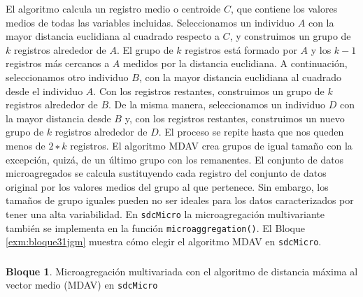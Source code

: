 \documentclass[]{book}
\newenvironment{Shaded}{\begin{snugshade}}{\end{snugshade}}
\newcommand{\CommentTok}[1]{\textcolor[rgb]{0.56,0.35,0.01}{\textit{#1}}}
\newcommand{\DataTypeTok}[1]{\textcolor[rgb]{0.13,0.29,0.53}{#1}}
\newcommand{\KeywordTok}[1]{\textcolor[rgb]{0.13,0.29,0.53}{\textbf{#1}}}
\newcommand{\NormalTok}[1]{#1}
\newcommand{\StringTok}[1]{\textcolor[rgb]{0.31,0.60,0.02}{#1}}
\theoremstyle{definition}
\theoremstyle{definition}
\newtheorem{example}{Bloque}[chapter]
\theoremstyle{definition}
\theoremstyle{definition}
\theoremstyle{remark}
\begin{document}
El algoritmo calcula un registro medio o centroide \(C\), que contiene los valores medios de todas las variables incluidas. Seleccionamos un individuo \(A\) con la mayor distancia euclidiana al cuadrado respecto a \(C\), y construimos un grupo de \(k\) registros alrededor de \(A\). El grupo de \(k\) registros está formado por \(A\) y los \(k-1\) registros más cercanos a \(A\) medidos por la distancia euclidiana. A continuación, seleccionamos otro individuo \(B\), con la mayor distancia euclidiana al cuadrado desde el individuo \(A\). Con los registros restantes, construimos un grupo de \(k\) registros alrededor de \(B\). De la misma manera, seleccionamos un individuo \(D\) con la mayor distancia desde \(B\) y, con los registros restantes, construimos un nuevo grupo de \(k\) registros alrededor de \(D\). El proceso se repite hasta que nos queden menos de \(2∗k\) registros. El algoritmo MDAV crea grupos de igual tamaño con la excepción, quizá, de un último grupo con los remanentes. El conjunto de datos microagregados se calcula sustituyendo cada registro del conjunto de datos original por los valores medios del grupo al que pertenece. Sin embargo, los tamaños de grupo iguales pueden no ser ideales para los datos caracterizados por tener una alta variabilidad. En \texttt{sdcMicro} la microagregación multivariante también se implementa en la función \texttt{microaggregation()}. El Bloque \ref{exm:bloque31jgm} muestra cómo elegir el algoritmo MDAV en \texttt{sdcMicro}.

\hypertarget{section-5}{%
\subsubsection{}\label{section-5}}

\begin{example}
\protect\hypertarget{exm:bloque31jgm}{}{\label{exm:bloque31jgm} }Microagregación multivariada con el algoritmo de distancia máxima al vector medio (MDAV) en \texttt{sdcMicro}
\end{example}

\begin{Shaded}
\end{Shaded}
\end{document}
